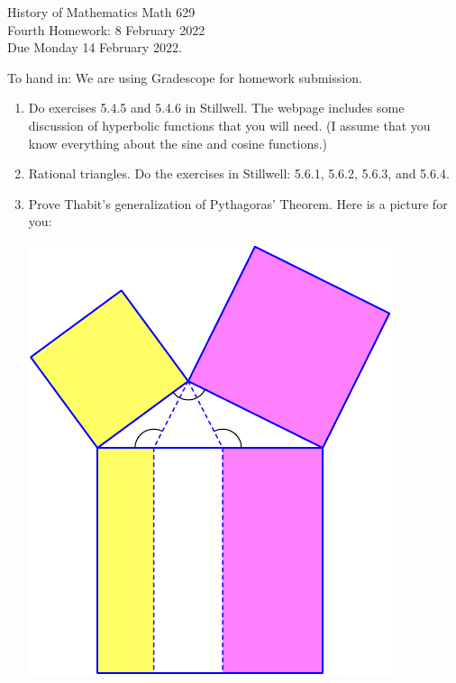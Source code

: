 \documentclass[12pt]{article}
\begin{document}
\LARGE 
\noindent
{\color{Maroon}History of Mathematics \hfill Math 629}\vspace{2pt}\\
\large
Fourth Homework: \hfill 8 February 2022\\
Due Monday 14 February 2022.
\normalsize\vspace{10pt}

To hand in: We are using Gradescope for homework submission.


\begin{enumerate}

\item  Do exercises 5.4.5 and 5.4.6 in Stillwell.
  The webpage includes some discussion of hyperbolic functions that you will need.
  (I assume that you know everything about the sine and cosine functions.)

\item   Rational triangles.  Do the exercises in Stillwell: 5.6.1,  5.6.2,  5.6.3,  and  5.6.4.


\item   Prove Thabit's generalization of Pythagoras' Theorem.  Here is a picture for you:

\includegraphics{Thabit}
  
\end{enumerate}
\end{document}
